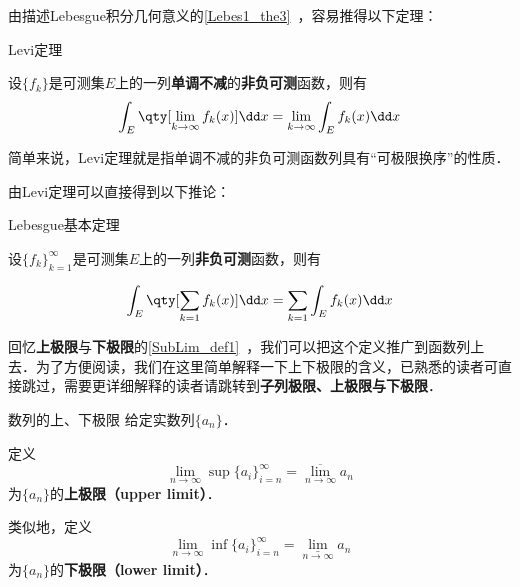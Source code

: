 

由描述Lebesgue积分几何意义的\autoref{Lebes1_the3}~，容易推得以下定理：

\begin{theorem}{Levi定理}

设$\{f_k\}$是可测集$E$上的一列\textbf{单调不减}的\textbf{非负可测}函数，则有
\begin{equation}
\int_E  \qty[\lim\limits_{k\to \infty} f_k(x)] \dd x = \lim\limits_{k\to \infty}\int_E f_k(x) \dd x
\end{equation}

\end{theorem}

简单来说，Levi定理就是指单调不减的非负可测函数列具有“可极限换序”的性质．

由Levi定理可以直接得到以下推论：

\begin{corollary}{Lebesgue基本定理}

设$\{f_k\}^\infty_{k=1}$是可测集$E$上的一列\textbf{非负可测}函数，则有

\begin{equation}
\int_E  \qty[\sum\limits_{k=1}f_k(x)] \dd x = \sum\limits_{k=1} \int_E f_k(x) \dd x
\end{equation}

\end{corollary}

回忆\textbf{上极限}与\textbf{下极限}的\autoref{SubLim_def1}~，我们可以把这个定义推广到函数列上去．为了方便阅读，我们在这里简单解释一下上下极限的含义，已熟悉的读者可直接跳过，需要更详细解释的读者请跳转到\textbf{子列极限、上极限与下极限}．

\begin{definition}{数列的上、下极限}\label{Lebes2_def2}
给定实数列$\{a_n\}$．

定义
\begin{equation}
\lim\limits_{n\to\infty} \sup\{a_i\}_{i=n}^\infty = \overline{\lim}\limits_{n\to\infty} a_n
\end{equation}
为$\{a_n\}$的\textbf{上极限（upper limit）}．

类似地，定义
\begin{equation}
\lim\limits_{n\to\infty} \inf\{a_i\}_{i=n}^\infty = \underline{\lim}\limits_{n\to\infty} a_n
\end{equation}
为$\{a_n\}$的\textbf{下极限（lower limit）}．
\end{definition}


